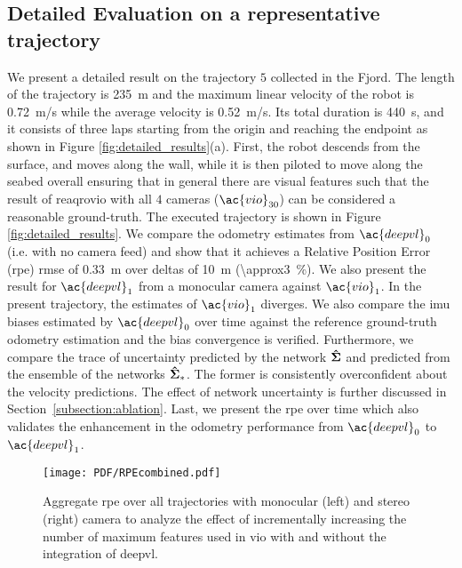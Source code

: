 \subsection{Detailed Evaluation on a representative trajectory}
We present a detailed result on the trajectory $5$ collected in the Fjord. The length of the trajectory is \SI{235}{\meter} and the maximum linear velocity of the robot is \SI{0.72}{\meter/\second} while the average velocity is \SI{0.52}{\meter/\second}. Its total duration is \SI{440}{\second}, and it consists of three laps starting from the origin and reaching the endpoint as shown in Figure \ref{fig:detailed_results}(a). First, the robot descends from the surface, and moves along the wall, while it is then piloted to move along the seabed overall ensuring that in general there are visual features such that the result of \ac{reaqrovio} with all $4$ cameras ($\ac{vio}_{30}$) can be considered a reasonable ground-truth. The executed trajectory is shown in Figure \ref{fig:detailed_results}. We compare the odometry estimates from $\ac{deepvl}_{0}$ (i.e. with no camera feed) and show that it achieves a Relative Position Error (\ac{rpe}) \ac{rmse} of \SI{0.33}{\meter} over deltas of \SI{10}{\meter} (\SI{\approx3}{\percent}). We also present the result for $\ac{deepvl}_{1}$  from a monocular camera against $\ac{vio}_{1}$. In the present trajectory, the estimates of $\ac{vio}_{1}$ diverges. We also compare the \ac{imu} biases estimated by $\ac{deepvl}_{0}$ over time against the reference ground-truth odometry estimation and the bias convergence is verified. Furthermore, we compare the trace of uncertainty predicted by the network $\mathbf{\hat{\Sigma}}$ and predicted from the ensemble of the networks $\mathbf{\hat{\Sigma}}_{*}$. The former is consistently overconfident about the velocity predictions. The effect of network uncertainty is further discussed in Section~\ref{subsection:ablation}. Last, we present the \ac{rpe} over time which also validates the enhancement in the odometry performance from $\ac{deepvl}_{0}$ to $\ac{deepvl}_{1}$.
\begin{figure}
    \centering
    \texttt{[image: PDF/RPEcombined.pdf]}
    \caption{Aggregate \ac{rpe} over all trajectories with monocular (left) and stereo (right) camera to analyze the effect of incrementally increasing the number of maximum features used in \ac{vio} with and without the integration of \ac{deepvl}.}
    \label{fig:aggregate_rpe}
\end{figure}
